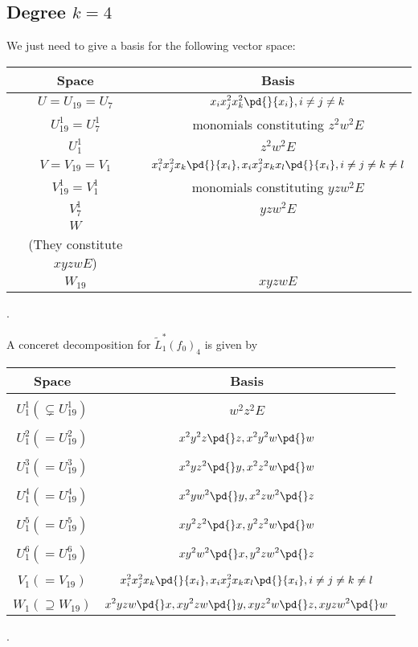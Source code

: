 \subsection{Degree \texorpdfstring{$k=4$}{k=4}}\label{app-C-4}
We just need to give a basis for the following vector space:
\begin{center}
\begin{longtable}{ c |  c }
Space &Basis \\
\hline
$U=U_{19}=U_7$ & $\displaystyle x_ix_j^2x_k^2\pd{}{x_i}, i \not=j\not=k$ \\
$U_{19}^1=U_7^1$ &  monomials constituting $z^2w^2 E$\\
$U_1^1$ & $z^2 w^2 E$\\
$V=V_{19}=V_1$ & $\displaystyle x_i^2x_j^2x_k \pd{}{x_i}, x_ix_j^2x_kx_l\pd{}{x_i}, i \not=j\not=k\not=l$ \\
$V_{19}^1=V_1^1$ & monomials constituting $yzw^2 E$\\
$V_7^1$ & $yzw^2 E$\\
$W$ & 
\makecell{
$\displaystyle x_i ^2x_jx_kx_l\pd{}x_i, i\not=j\not=k\not=l,$
\\
(They  constitute $xyzw E$)
}
\\
$W_{19}$ & $xyzwE$ 
\end{longtable}.
\end{center}

	A conceret decomposition for $\tilde L^*_1(f_0)_4$ is given by
\begin{center}
\begin{longtable}{ c |  c }
Space &Basis \\
\hline
	&\\
$U_1^1(\subsetneq U_{19}^1)$ & $w^2z^2E$ \\
	&\\
$U_1^2(=U_{19}^2)$ & $\displaystyle 
	x^2y^2z\pd{}z,
	x^2y^2w\pd{}w$ \\
	&\\
$U_1^3(=U_{19}^3)$&  $\displaystyle 
	x^2yz^2\pd{}y,
	x^2z^2w\pd{}w$\\
	&\\
$U_1^4(=U_{19}^4)$ & $\displaystyle 
	x^2yw^2\pd{}y,
	x^2zw^2\pd{}z$ \\
	&\\
$U_1^5(=U_{19}^5)$ &  $\displaystyle 
	xy^2z^2\pd{}x,
	y^2z^2w\pd{}w$\\
	&\\
$U_1^6(=U_{19}^6)$ &  $\displaystyle 
	xy^2w^2\pd{}x,
	y^2zw^2\pd{}z$ \\
	&\\
$V_1(=V_{19})$ &
$\displaystyle x_i^2x_j^2x_k \pd{}{x_i}, x_ix_j^2x_kx_l\pd{}{x_i}, i \not=j\not=k\not=l$\\
	&\\
$W_1(\supseteq W_{19})$ &  	$\displaystyle 
	x^2yzw\pd{}x,
	xy^2zw\pd{}y,
	xyz^2w\pd{}z,
	xyzw^2\pd{}w$
\end{longtable}.
\end{center}


